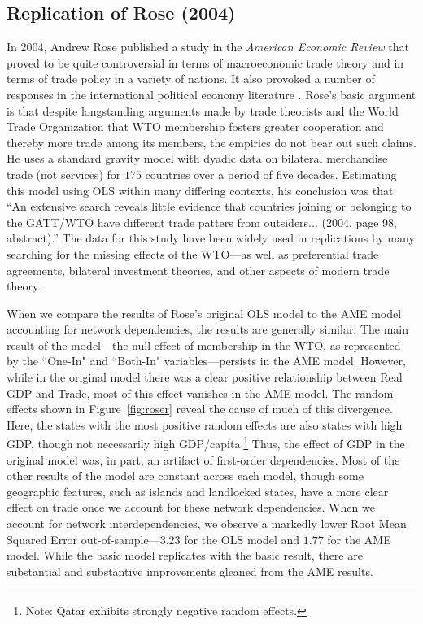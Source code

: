\subsection{Replication of Rose (2004)}

In 2004, Andrew Rose published a study in the \textit{American Economic Review} \nocite{rose:2004} that proved to be quite controversial in terms of macroeconomic trade theory and in terms of trade policy in a variety of nations. It also provoked a number of responses in the international political economy literature \cite{tomz:etal:2007,ward:etal:2013}.  Rose's basic argument is that despite longstanding arguments made by trade theorists and the World Trade Organization that WTO membership fosters greater cooperation and thereby more trade among its members, the empirics do not bear out such claims. He uses a standard gravity model with dyadic data on bilateral merchandise trade (not services) for $175$ countries over a period of five decades. Estimating this model using OLS within many differing contexts, his conclusion was that: ``An extensive search reveals little evidence that countries joining or belonging to the GATT/WTO have different trade patters from outsiders... (2004, page 98, abstract).''  The data for this study have been widely used in replications by many searching for the missing effects of the WTO---as well as preferential trade agreements, bilateral investment theories, and other aspects of modern trade theory.  

When we compare the results of Rose's original OLS model to the AME model accounting for network dependencies, the results are generally similar. The main result of the model---the null effect of membership in the WTO, as represented by the ``One-In" and ``Both-In" variables---persists in the AME model. However, while in the original model there was a clear positive relationship between Real GDP and Trade, most of this effect vanishes in the AME model. The random effects shown in Figure~\ref{fig:roser} reveal the cause of much of this divergence. Here, the states with the most positive random effects are also states with high GDP, though not necessarily high GDP/capita.\footnote{Note: Qatar exhibits strongly negative random effects.} Thus, the effect of GDP in the original model was, in part, an artifact of first-order dependencies. Most of the other results of the model are constant across each model, though some geographic features, such as islands and landlocked states, have a more clear effect on trade once we account for these network dependencies. When we account for network interdependencies, we observe a markedly lower Root Mean Squared Error out-of-sample---$3.23$ for the OLS model and $1.77$ for the AME model. While the basic model replicates with the basic result, there are substantial and substantive improvements gleaned from the AME results.

